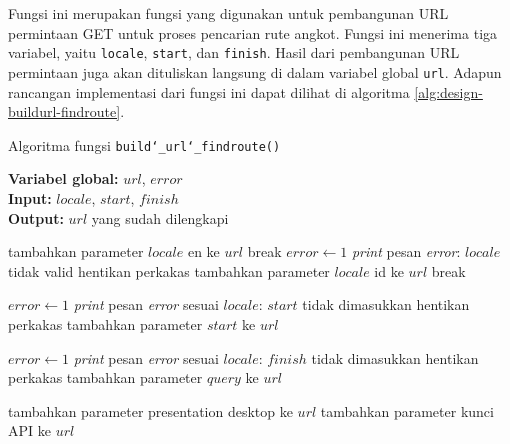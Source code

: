 Fungsi ini merupakan fungsi yang digunakan untuk pembangunan URL permintaan	GET untuk proses pencarian rute angkot. Fungsi ini menerima tiga variabel, yaitu \verb|locale|, \verb|start|, dan \verb|finish|. Hasil dari pembangunan URL permintaan juga akan dituliskan langsung di dalam variabel global \verb|url|. Adapun rancangan implementasi dari fungsi ini dapat dilihat di algoritma \ref{alg:design-buildurl-findroute}.

\begin{algorithm}[h]
	\caption{Algoritma fungsi \texttt{build\char`_url\char`_findroute()}}
	\label{alg:design-buildurl-findroute}
	\vspace{-0.6\baselineskip}
	\begin{flushleft}
		\textbf{Variabel global:} $url$, $error$ \\
        \textbf{Input:} $locale$, $start$, $finish$ \\
        \textbf{Output:} $url$ yang sudah dilengkapi \\
	\end{flushleft}
	\vspace{-1.05\baselineskip}
	\begin{algorithmic}
	
			    \State tambahkan parameter $locale$ \textquotesingle\textquotesingle en\textquotesingle\textquotesingle\xspace ke $url$
				\State break
			\EndCase
			    \State $error \gets 1$
				\State \textit{print} pesan \textit{error}: $locale$ tidak valid
				\State hentikan perkakas
			\EndCase
			\Default
				\State tambahkan parameter $locale$ \textquotesingle\textquotesingle id\textquotesingle\textquotesingle\xspace ke $url$
				\State break
			\EndDefault
		\EndSwitch
		
		    \State $error \gets 1$
			\State \textit{print} pesan \textit{error} sesuai $locale$: $start$ tidak dimasukkan
			\State hentikan perkakas
		\Else
			\State tambahkan parameter $start$ ke $url$
		\EndIf
		
		    \State $error \gets 1$
			\State \textit{print} pesan \textit{error} sesuai $locale$: $finish$ tidak dimasukkan
			\State hentikan perkakas
		\Else
			\State tambahkan parameter $query$ ke $url$
		\EndIf
		
		\State tambahkan parameter presentation \textquotesingle\textquotesingle desktop\textquotesingle\textquotesingle\xspace ke $url$
		\State tambahkan parameter kunci API ke $url$
	\end{algorithmic}
\end{algorithm}

